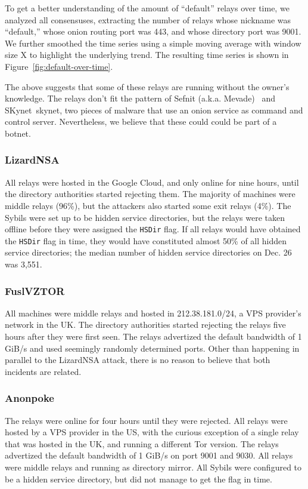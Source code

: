 To get a better understanding of the amount of ``default'' relays over time, we
analyzed all consensuses, extracting the number of relays whose nickname was
``default,'' whose onion routing port was 443, and whose directory port was
9001.  We further smoothed the time series using a simple moving average with
window size X to highlight the underlying trend.  The resulting time series is
shown in Figure~\ref{fig:default-over-time}.

The above suggests that some of these relays are running without the owner's
knowledge.  The relays don't fit the pattern of Sefnit (a.k.a.
Mevade)~\cite{sefnit} and SKynet~{skynet}, two pieces of malware that use an
onion service as command and control server.  Nevertheless, we believe that
these could could be part of a botnet.

\subsubsection{LizardNSA}
All relays were hosted in the Google Cloud, and only online for nine hours,
until the directory authorities started rejecting them.  The majority of
machines were middle relays (96\%), but the attackers also started some exit
relays (4\%).  The Sybils were set up to be hidden service directories, but the
relays were taken offline before they were assigned the \texttt{HSDir} flag.  If
all relays would have obtained the \texttt{HSDir} flag in time, they would have
constituted almost 50\% of all hidden service directories; the median number of
hidden service directories on Dec. 26 was 3,551.

\subsubsection{FuslVZTOR}
All machines were middle relays and hosted in 212.38.181.0/24, a VPS provider's
network in the UK.  The directory authorities started rejecting the relays five
hours after they were first seen.  The relays advertized the default bandwidth
of 1 GiB/s and used seemingly randomly determined ports.  Other than happening
in parallel to the LizardNSA attack, there is no reason to believe that both
incidents are related.

\subsubsection{Anonpoke}
The relays were online for four hours until they were rejected.  All relays were
hosted by a VPS provider in the US, with the curious exception of a single relay
that was hosted in the UK, and running a different Tor version.  The relays
advertized the default bandwidth of 1 GiB/s on port 9001 and 9030.  All relays
were middle relays and running as directory mirror.  All Sybils were configured
to be a hidden service directory, but did not manage to get the flag in time.

